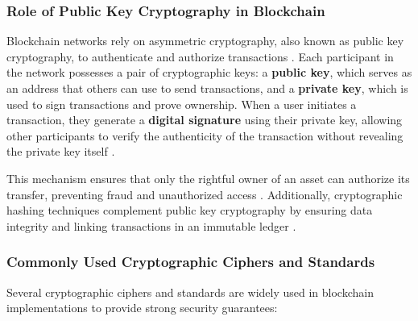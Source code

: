 \documentclass{article}
\begin{document}
\subsubsection{Role of Public Key Cryptography in Blockchain}
Blockchain networks rely on asymmetric cryptography, also known as public key cryptography, to authenticate and authorize transactions \cite{rivest1978method}. Each participant in the network possesses a pair of cryptographic keys: a \textbf{public key}, which serves as an address that others can use to send transactions, and a \textbf{private key}, which is used to sign transactions and prove ownership. When a user initiates a transaction, they generate a \textbf{digital signature} using their private key, allowing other participants to verify the authenticity of the transaction without revealing the private key itself \cite{menezes2018handbook}.

This mechanism ensures that only the rightful owner of an asset can authorize its transfer, preventing fraud and unauthorized access \cite{wood2014ethereum}. Additionally, cryptographic hashing techniques complement public key cryptography by ensuring data integrity and linking transactions in an immutable ledger \cite{merkle1988digital}.

\subsubsection{Commonly Used Cryptographic Ciphers and Standards}
Several cryptographic ciphers and standards are widely used in blockchain implementations to provide strong security guarantees:
\end{document}
